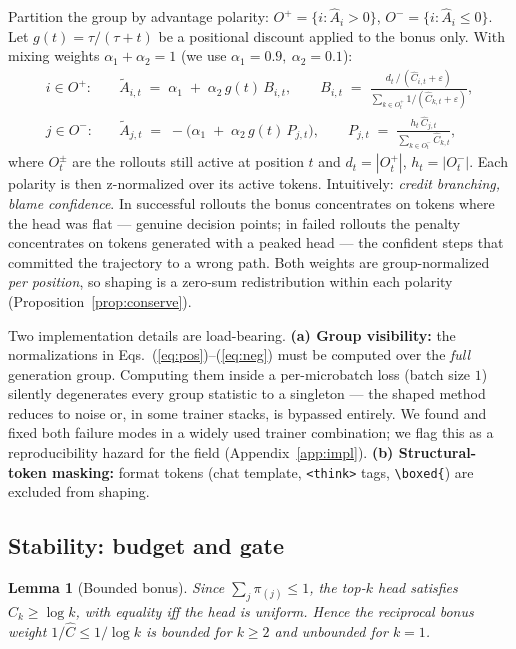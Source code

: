 \documentclass{article} %
\theoremstyle{plain}
\newtheorem{lemma}[theorem]{Lemma}
\theoremstyle{definition}
\theoremstyle{remark}
\begin{document}
Partition the group by advantage polarity: $O^+=\{i: \hat A_i > 0\}$, $O^-=\{i: \hat A_i \le 0\}$. Let $g(t)=\tau/(\tau+t)$ be a positional discount applied to the bonus only. With mixing weights $\alpha_1+\alpha_2=1$ (we use $\alpha_1{=}0.9,\ \alpha_2{=}0.1$):
\begin{align}
i \in O^+:\quad & \tilde A_{i,t} \;=\; \alpha_1 \;+\; \alpha_2\, g(t)\, B_{i,t}, \qquad B_{i,t} \;=\; \frac{d_t\,/\,(\hat C_{i,t}+\varepsilon)}{\sum_{k\in O^+_t} 1/(\hat C_{k,t}+\varepsilon)},
\label{eq:pos}\\
j \in O^-:\quad & \tilde A_{j,t} \;=\; -\Big(\alpha_1 \;+\; \alpha_2\, g(t)\, P_{j,t}\Big), \qquad P_{j,t} \;=\; \frac{h_t\, \hat C_{j,t}}{\sum_{k\in O^-_t} \hat C_{k,t}},
\label{eq:neg}
\end{align}
where $O^{\pm}_t$ are the rollouts still active at position $t$ and $d_t=|O^+_t|$, $h_t=|O^-_t|$. Each polarity is then z-normalized over its active tokens. Intuitively: \emph{credit branching, blame confidence}. In successful rollouts the bonus concentrates on tokens where the head was flat --- genuine decision points; in failed rollouts the penalty concentrates on tokens generated with a peaked head --- the confident steps that committed the trajectory to a wrong path. Both weights are group-normalized \emph{per position}, so shaping is a zero-sum redistribution within each polarity (Proposition~\ref{prop:conserve}).

Two implementation details are load-bearing. \textbf{(a) Group visibility:} the normalizations in Eqs.~(\ref{eq:pos})--(\ref{eq:neg}) must be computed over the \emph{full} generation group. Computing them inside a per-microbatch loss (batch size $1$) silently degenerates every group statistic to a singleton --- the shaped method reduces to noise or, in some trainer stacks, is bypassed entirely. We found and fixed both failure modes in a widely used trainer combination; we flag this as a reproducibility hazard for the field (Appendix~\ref{app:impl}). \textbf{(b) Structural-token masking:} format tokens (chat template, \texttt{<think>} tags, \texttt{\textbackslash boxed\{}) are excluded from shaping.

\subsection{Stability: budget and gate}
\label{sec:stability}

\begin{lemma}[Bounded bonus]
\label{lem:bounded}
Since $\sum_j \pi_{(j)} \le 1$, the top-$k$ head satisfies $C_k \ge \log k$, with equality iff the head is uniform. Hence the reciprocal bonus weight $1/\hat C \le 1/\log k$ is bounded for $k\ge 2$ and unbounded for $k=1$.
\end{lemma}
\end{document}
